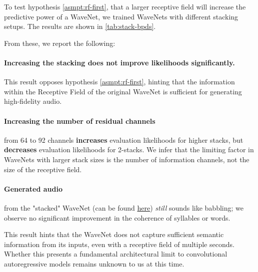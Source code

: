 To test hypothesis \ref{asmpt:rf-first}, that a larger receptive field will increase the predictive power of a WaveNet, we trained WaveNets with different stacking setups.
The results are shown in \cref{tab:stack-bpds}.

From these, we report the following:
\paragraph{Increasing the stacking does not improve likelihoods significantly.}
This result opposes hypothesis \ref{asmpt:rf-first}, hinting that the information within the Receptive Field of the original WaveNet is sufficient for generating high-fidelity audio.

\paragraph{Increasing the number of residual channels} from 64 to 92 channels \textbf{increases} evaluation likelihoods for higher stacks, but \textbf{decreases} evaluation likelihoods for 2-stacks. We infer that the limiting factor in WaveNets with larger stack sizes is the number of information channels, not the size of the receptive field. 

\paragraph{Generated audio} from the "stacked" WaveNet (can be found \href{https://magnus.sletfjerding.no/publication/msc-thesis/}{here}) \textit{still} sounds like babbling; we observe no significant improvement in the coherence of syllables or words. 

This result hints that the WaveNet does not capture sufficient semantic information from its inputs, even with a receptive field of multiple seconds. 
Whether this presents a fundamental architectural limit to convolutional autoregressive  models remains unknown to us at this time.

